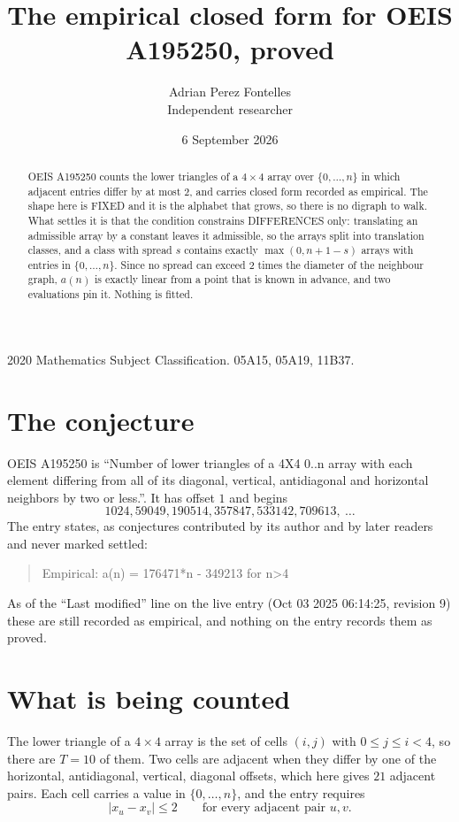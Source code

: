 \documentclass[11pt,a4paper]{article}
\title{The empirical closed form for OEIS A195250, proved}
\author{Adrian Perez Fontelles\\ \small Independent researcher}
\date{6 September 2026}
\theoremstyle{plain}
\theoremstyle{definition}
\begin{document}
\maketitle

\begin{abstract}
OEIS A195250 counts the lower triangles of a $4\times4$ array over $\{0,\dots,n\}$ in which
adjacent entries differ by at most $2$, and carries closed form recorded as empirical. The shape here is FIXED
and it is the alphabet that grows, so there is no digraph to walk. What settles it is that the
condition constrains DIFFERENCES only: translating an admissible array by a constant leaves it
admissible, so the arrays split into translation classes, and a class with spread $s$ contains
exactly $\max(0,n+1-s)$ arrays with entries in $\{0,\dots,n\}$. Since no spread can exceed
$2$ times the diameter of the neighbour graph, $a(n)$ is exactly linear from a point that is
known in advance, and two evaluations pin it. Nothing is fitted.
\end{abstract}

\noindent\small 2020 Mathematics Subject Classification. 05A15, 05A19, 11B37.\normalsize

\section{The conjecture}

OEIS A195250 is ``Number of lower triangles of a 4X4 0..n array with each element differing from all of its diagonal, vertical, antidiagonal and horizontal neighbors by two or less.''. It has offset $1$ and begins
\[
1024, 59049, 190514, 357847, 533142, 709613,\ \dots
\]
The entry states, as conjectures contributed by its author and by later readers and never
marked settled:
\begin{quote}
Empirical: a(n) = 176471*n - 349213 for n>4
\end{quote}
As of the ``Last modified'' line on the live entry (Oct 03 2025 06:14:25, revision 9) these are still
recorded as empirical, and nothing on the entry records them as proved.

\section{What is being counted}

The lower triangle of a $4\times4$ array is the set of cells $(i,j)$ with $0\le j\le
i<4$, so there are $T=10$ of them. Two cells are adjacent when they differ by one of the
horizontal, antidiagonal, vertical, diagonal offsets, which here gives $21$ adjacent pairs. Each cell carries a value in
$\{0,\dots,n\}$, and the entry requires
\[
|x_u-x_v|\le 2\qquad\text{for every adjacent pair }u,v .
\]
\end{document}
